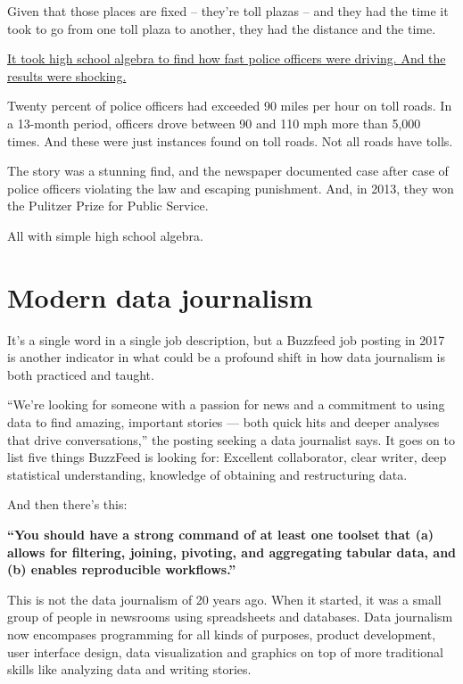 \documentclass[
  letterpaper,
  DIV=11,
  numbers=noendperiod]{scrreprt}
\begin{document}
Given that those places are fixed -- they're toll plazas -- and they had
the time it took to go from one toll plaza to another, they had the
distance and the time.

\href{http://www.sun-sentinel.com/news/local/speeding-cops/fl-speeding-cops-20120211,0,3706919.story}{It
took high school algebra to find how fast police officers were driving.
And the results were shocking.}

Twenty percent of police officers had exceeded 90 miles per hour on toll
roads. In a 13-month period, officers drove between 90 and 110 mph more
than 5,000 times. And these were just instances found on toll roads. Not
all roads have tolls.

The story was a stunning find, and the newspaper documented case after
case of police officers violating the law and escaping punishment. And,
in 2013, they won the Pulitzer Prize for Public Service.

All with simple high school algebra.

\hypertarget{modern-data-journalism}{%
\section{Modern data journalism}\label{modern-data-journalism}}

It's a single word in a single job description, but a Buzzfeed job
posting in 2017 is another indicator in what could be a profound shift
in how data journalism is both practiced and taught.

``We're looking for someone with a passion for news and a commitment to
using data to find amazing, important stories --- both quick hits and
deeper analyses that drive conversations,'' the posting seeking a data
journalist says. It goes on to list five things BuzzFeed is looking for:
Excellent collaborator, clear writer, deep statistical understanding,
knowledge of obtaining and restructuring data.

And then there's this:

\textbf{``You should have a strong command of at least one toolset that
(a) allows for filtering, joining, pivoting, and aggregating tabular
data, and (b) enables reproducible workflows.''}

This is not the data journalism of 20 years ago. When it started, it was
a small group of people in newsrooms using spreadsheets and databases.
Data journalism now encompases programming for all kinds of purposes,
product development, user interface design, data visualization and
graphics on top of more traditional skills like analyzing data and
writing stories.
\end{document}
